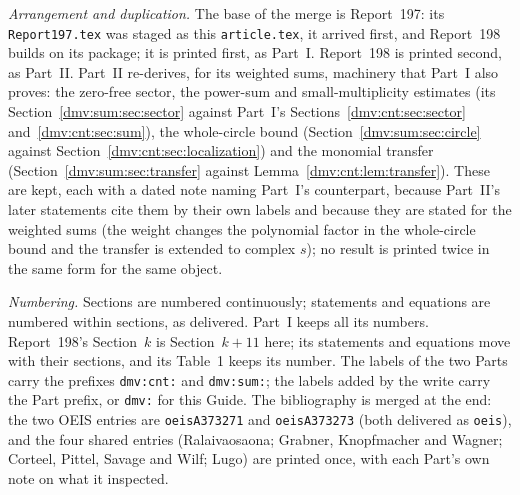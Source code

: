 \documentclass[11pt,letterpaper]{article}
\numberwithin{equation}{section}
\theoremstyle{definition}\newtheorem{definition}[theorem]{Definition}
\theoremstyle{remark}\newtheorem{remark}[theorem]{Remark}
\newcommand{\file}[1]{\nolinkurl{#1}}
\begin{document}
\emph{Arrangement and duplication.} The base of the merge is Report~197:
its \file{Report197.tex} was staged as this \file{article.tex}, it arrived
first, and Report~198 builds on its package; it is printed first, as
Part~I. Report~198 is printed second, as Part~II. Part~II re-derives, for
its weighted sums, machinery that Part~I also proves: the zero-free sector,
the power-sum and small-multiplicity estimates (its Section~\ref{dmv:sum:sec:sector}
against Part~I's Sections~\ref{dmv:cnt:sec:sector} and~\ref{dmv:cnt:sec:sum}),
the whole-circle bound (Section~\ref{dmv:sum:sec:circle} against
Section~\ref{dmv:cnt:sec:localization}) and the monomial transfer
(Section~\ref{dmv:sum:sec:transfer} against
Lemma~\ref{dmv:cnt:lem:transfer}). These are kept, each with a dated note
naming Part~I's counterpart, because Part~II's later statements cite them by
their own labels and because they are stated for the weighted sums (the
weight changes the polynomial factor in the whole-circle bound and the
transfer is extended to complex $s$); no result is printed twice in the same
form for the same object.

\emph{Numbering.} Sections are numbered continuously; statements and
equations are numbered within sections, as delivered. Part~I keeps all its
numbers. Report~198's Section~$k$ is Section~$k+11$ here; its statements and
equations move with their sections, and its Table~1 keeps its number. The
labels of the two Parts carry the prefixes \file{dmv:cnt:} and
\file{dmv:sum:}; the labels added by the write carry the Part prefix, or
\file{dmv:} for this Guide. The bibliography is merged at the end: the two
OEIS entries are \file{oeisA373271} and \file{oeisA373273} (both delivered
as \file{oeis}), and the four shared entries (Ralaivaosaona; Grabner,
Knopfmacher and Wagner; Corteel, Pittel, Savage and Wilf; Lugo) are printed
once, with each Part's own note on what it inspected.
\end{document}
